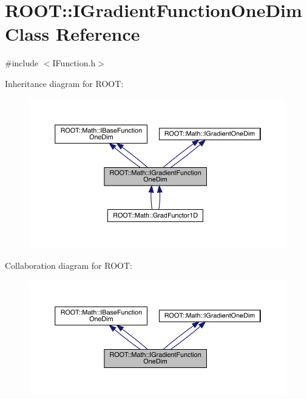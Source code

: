 \hypertarget{classROOT_1_1Math_1_1IGradientFunctionOneDim}{}\section{R\+O\+OT\+:\+:I\+Gradient\+Function\+One\+Dim Class Reference}
\label{classROOT_1_1Math_1_1IGradientFunctionOneDim}


{\ttfamily \#include $<$I\+Function.\+h$>$}



Inheritance diagram for R\+O\+OT\+:\nopagebreak
\begin{figure}[H]
\begin{center}
\leavevmode
\includegraphics[width=350pt]{df/d9b/classROOT_1_1Math_1_1IGradientFunctionOneDim__inherit__graph}
\end{center}
\end{figure}


Collaboration diagram for R\+O\+OT\+:\nopagebreak
\begin{figure}[H]
\begin{center}
\leavevmode
\includegraphics[width=350pt]{df/dbd/classROOT_1_1Math_1_1IGradientFunctionOneDim__coll__graph}
\end{center}
\end{figure}
